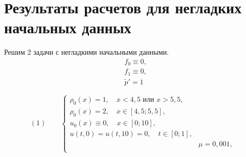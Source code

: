 \documentclass[a4paper, 11pt]{article}
\begin{document}
\section{Результаты расчетов для негладких начальных данных}
Решим 2 задачи с негладкими начальными данными.
\begin{equation}
\begin{split}
& f_0 \equiv  0, \\
& f_1  \equiv 0, \\
& \tilde{p}' = 1
\end{split}
\end{equation}

$$
(1)\quad \quad
\begin{cases}
\rho_0(x) = 1, \quad x < 4,5 \text{ или } x > 5,5,\\
\rho_0(x) = 2, \quad x \in [4,5; 5,5],\\
u_0(x) \equiv 0, \quad x \in [0; 10],\\
u(t, 0) = u(t, 10) = 0, \quad t \in [0; 1], \\
& \mu =  0,001, \\
\end{cases}
$$
\end{document}
